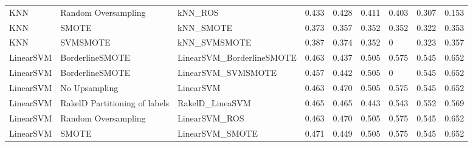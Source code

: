 \begin{tabular}{lllllllll}
                            KNN &           Random Oversampling &                                      kNN\_ROS & 0.433 &                     0.428 &                 0.411 &                  0.403 &                                   0.307 &     0.153 \\
                            KNN &                         SMOTE &                                    kNN\_SMOTE & 0.373 &                     0.357 &                 0.352 &                  0.352 &                                   0.322 &     0.353 \\
                            KNN &                      SVMSMOTE &                                 kNN\_SVMSMOTE & 0.387 &                     0.374 &                 0.352 &                      0 &                                   0.323 &     0.357 \\
                      LinearSVM &               BorderlineSMOTE &                    LinearSVM\_BorderlineSMOTE & 0.463 &                     0.437 &                 0.505 &                  0.575 &                                   0.545 &     0.652 \\
                      LinearSVM &               BorderlineSMOTE &                           LinearSVM\_SVMSMOTE & 0.457 &                     0.442 &                 0.505 &                      0 &                                   0.545 &     0.652 \\
                      LinearSVM &                 No Upsampling &                                    LinearSVM & 0.463 &                     0.470 &                 0.505 &                  0.575 &                                   0.545 &     0.652 \\
                      LinearSVM & RakelD Partitioning of labels &                              RakelD\_LineaSVM & 0.465 &                     0.465 &                 0.443 &                  0.543 &                                   0.552 &     0.569 \\
                      LinearSVM &           Random Oversampling &                                LinearSVM\_ROS & 0.463 &                     0.470 &                 0.505 &                  0.575 &                                   0.545 &     0.652 \\
                      LinearSVM &                         SMOTE &                              LinearSVM\_SMOTE & 0.471 &                     0.449 &                 0.505 &                  0.575 &                                   0.545 &     0.652 \\

\end{tabular}
